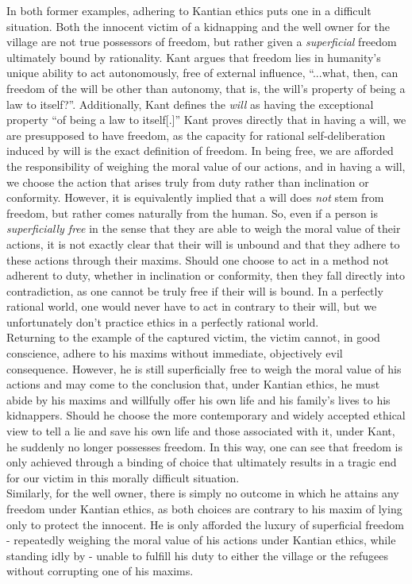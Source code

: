 \documentclass[12pt]{article}
\begin{document}
\begin{flushleft}
In both former examples, adhering to Kantian ethics puts one in a difficult situation. Both the innocent victim of a kidnapping and the well owner for the village are not true possessors of freedom, but rather given a \textit{superficial} freedom ultimately bound by rationality. Kant argues that freedom lies in humanity's unique ability to act autonomously, free of external influence, ``...what, then, can freedom of the will be other than autonomy, that is, the will's property of being a law to itself?''. Additionally, Kant defines the \textit{will} as having the exceptional property ``of being a law to itself[.]'' Kant proves directly that in having a will, we are presupposed to have freedom, as the capacity for rational self-deliberation induced by will is the exact definition of freedom. In being free, we are afforded the responsibility of weighing the moral value of our actions, and in having a will, we choose the action that arises truly from duty rather than inclination or conformity.  However, it is equivalently implied that a will does \textit{not} stem from freedom, but rather comes naturally from the human. So, even if a person is \textit{superficially free} in the sense that they are able to weigh the moral value of their actions, it is not exactly clear that their will is unbound and that they adhere to these actions through their maxims. Should one choose to act in a method not adherent to duty, whether in inclination or conformity, then they fall directly into contradiction, as one cannot be truly free if their will is bound. In a perfectly rational world, one would never have to act in contrary to their will, but we unfortunately don't practice ethics in a perfectly rational world.\\
Returning to the example of the captured victim, the victim cannot, in good conscience, adhere to his maxims without immediate, objectively evil consequence. However, he is still superficially free to weigh the moral value of his actions and may come to the conclusion that, under Kantian ethics, he must abide by his maxims and willfully offer his own life and his family's lives to his kidnappers. Should he choose the more contemporary and widely accepted ethical view to tell a lie and save his own life and those associated with it, under Kant, he suddenly no longer possesses freedom. In this way, one can see that freedom is only achieved through a binding of choice that ultimately results in a tragic end for our victim in this morally difficult situation.\\
Similarly, for the well owner, there is simply no outcome in which he attains any freedom under Kantian ethics, as both choices are contrary to his maxim of lying only to protect the innocent. He is only afforded the luxury of superficial freedom - repeatedly weighing the moral value of his actions under Kantian ethics, while standing idly by - unable to fulfill his duty to either the village or the refugees without corrupting one of his maxims.
\newpage



\end{flushleft}
\end{document}
